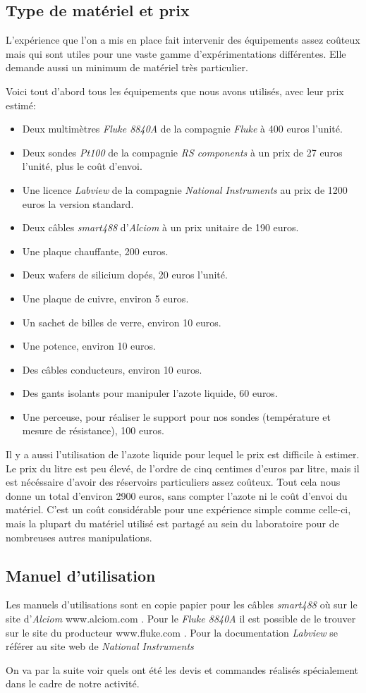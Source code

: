 \subsection{Type de matériel et prix}
L'expérience que l'on a mis en place fait intervenir des équipements assez coûteux mais qui sont utiles pour une vaste gamme d'expérimentations différentes. Elle demande aussi un minimum de matériel très particulier.

\bigskip
Voici tout d'abord tous les équipements que nous avons utilisés, avec leur prix estimé:

\begin{itemize}
  \item Deux multimètres \emph{Fluke 8840A} de la compagnie \emph{Fluke} à 400 euros l'unité.
  \item Deux sondes \emph{Pt100} de la compagnie \emph{RS components} à un prix de 27 euros l'unité, plus le coût d'envoi.
  \item Une licence \emph{Labview} de la compagnie \emph{National Instruments} au prix de 1200 euros la version standard.
  \item Deux câbles \emph{smart488} d'\emph{Alciom} à un prix unitaire de 190 euros.
  \item Une plaque chauffante, 200 euros.
  \item Deux wafers de silicium dopés, 20 euros l'unité.
  \item Une plaque de cuivre, environ 5 euros.
  \item Un sachet de billes de verre, environ 10 euros.
  \item Une potence, environ 10 euros. 
  \item Des câbles conducteurs, environ 10 euros.
  \item Des gants isolants pour manipuler l'azote liquide, 60 euros.
  \item Une perceuse, pour réaliser le support pour nos sondes (température et mesure de résistance), 100 euros.
\end{itemize}

\bigskip
Il y a aussi l'utilisation de l'azote liquide pour lequel le prix est difficile à estimer. Le prix du litre est peu élevé, de l'ordre de cinq centimes d'euros par litre, mais il est nécéssaire d'avoir des réservoirs particuliers assez coûteux.
Tout cela nous donne un total d'environ 2900 euros, sans compter l'azote ni le coût d'envoi du matériel.
C'est un coût considérable pour une expérience simple comme celle-ci, mais la plupart du matériel utilisé est partagé au sein du laboratoire pour de nombreuses autres manipulations.


\subsection{Manuel d'utilisation}
Les manuels d'utilisations sont en copie papier pour les câbles \emph{smart488} où sur le site d'\emph{Alciom} www.alciom.com . Pour le \emph{Fluke 8840A} il est possible de le trouver sur le site du producteur www.fluke.com . Pour la documentation \emph{Labview} se référer au site web de \emph{National Instruments}

On va par la suite voir quels ont été les devis et commandes réalisés spécialement dans le cadre de notre activité.
